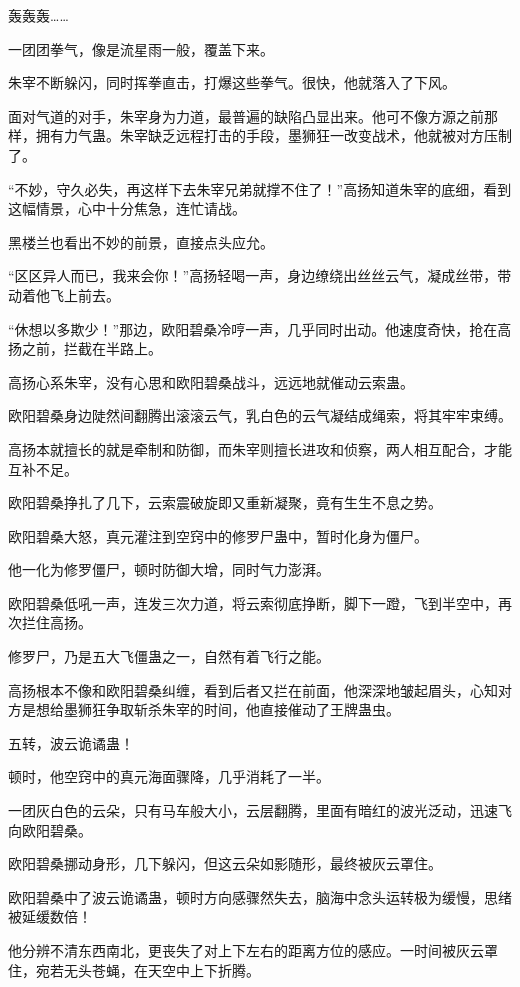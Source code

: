 \begin{this_body}
轰轰轰……

一团团拳气，像是流星雨一般，覆盖下来。

朱宰不断躲闪，同时挥拳直击，打爆这些拳气。很快，他就落入了下风。

面对气道的对手，朱宰身为力道，最普遍的缺陷凸显出来。他可不像方源之前那样，拥有力气蛊。朱宰缺乏远程打击的手段，墨狮狂一改变战术，他就被对方压制了。

“不妙，守久必失，再这样下去朱宰兄弟就撑不住了！”高扬知道朱宰的底细，看到这幅情景，心中十分焦急，连忙请战。

黑楼兰也看出不妙的前景，直接点头应允。

“区区异人而已，我来会你！”高扬轻喝一声，身边缭绕出丝丝云气，凝成丝带，带动着他飞上前去。

“休想以多欺少！”那边，欧阳碧桑冷哼一声，几乎同时出动。他速度奇快，抢在高扬之前，拦截在半路上。

高扬心系朱宰，没有心思和欧阳碧桑战斗，远远地就催动云索蛊。

欧阳碧桑身边陡然间翻腾出滚滚云气，乳白色的云气凝结成绳索，将其牢牢束缚。

高扬本就擅长的就是牵制和防御，而朱宰则擅长进攻和侦察，两人相互配合，才能互补不足。

欧阳碧桑挣扎了几下，云索震破旋即又重新凝聚，竟有生生不息之势。

欧阳碧桑大怒，真元灌注到空窍中的修罗尸蛊中，暂时化身为僵尸。

他一化为修罗僵尸，顿时防御大增，同时气力澎湃。

欧阳碧桑低吼一声，连发三次力道，将云索彻底挣断，脚下一蹬，飞到半空中，再次拦住高扬。

修罗尸，乃是五大飞僵蛊之一，自然有着飞行之能。

高扬根本不像和欧阳碧桑纠缠，看到后者又拦在前面，他深深地皱起眉头，心知对方是想给墨狮狂争取斩杀朱宰的时间，他直接催动了王牌蛊虫。

五转，波云诡谲蛊！

顿时，他空窍中的真元海面骤降，几乎消耗了一半。

一团灰白色的云朵，只有马车般大小，云层翻腾，里面有暗红的波光泛动，迅速飞向欧阳碧桑。

欧阳碧桑挪动身形，几下躲闪，但这云朵如影随形，最终被灰云罩住。

欧阳碧桑中了波云诡谲蛊，顿时方向感骤然失去，脑海中念头运转极为缓慢，思绪被延缓数倍！

他分辨不清东西南北，更丧失了对上下左右的距离方位的感应。一时间被灰云罩住，宛若无头苍蝇，在天空中上下折腾。


\end{this_body}
